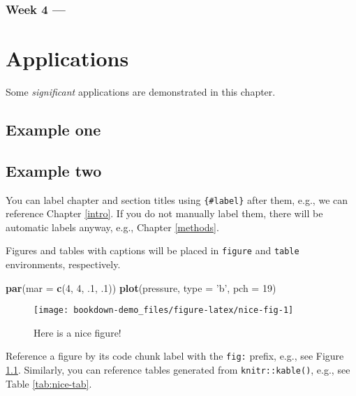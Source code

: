 \documentclass[]{book}
\newenvironment{Shaded}{\begin{snugshade}}{\end{snugshade}}
\newcommand{\KeywordTok}[1]{\textcolor[rgb]{0.13,0.29,0.53}{\textbf{{#1}}}}
\newcommand{\DataTypeTok}[1]{\textcolor[rgb]{0.13,0.29,0.53}{{#1}}}
\newcommand{\DecValTok}[1]{\textcolor[rgb]{0.00,0.00,0.81}{{#1}}}
\newcommand{\StringTok}[1]{\textcolor[rgb]{0.31,0.60,0.02}{{#1}}}
\newcommand{\NormalTok}[1]{{#1}}
\theoremstyle{definition}
\theoremstyle{definition}
\theoremstyle{remark}
\begin{document}
\subsection{Week 4 ---}\label{week-4}

\chapter{Applications}\label{applications}

Some \emph{significant} applications are demonstrated in this chapter.

\section{Example one}\label{example-one}

\section{Example two}\label{example-two}

You can label chapter and section titles using \texttt{\{\#label\}}
after them, e.g., we can reference Chapter \ref{intro}. If you do not
manually label them, there will be automatic labels anyway, e.g.,
Chapter \ref{methods}.

Figures and tables with captions will be placed in \texttt{figure} and
\texttt{table} environments, respectively.

\begin{Shaded}
\begin{Highlighting}[]
\KeywordTok{par}\NormalTok{(}\DataTypeTok{mar =} \KeywordTok{c}\NormalTok{(}\DecValTok{4}\NormalTok{, }\DecValTok{4}\NormalTok{, .}\DecValTok{1}\NormalTok{, .}\DecValTok{1}\NormalTok{))}
\KeywordTok{plot}\NormalTok{(pressure, }\DataTypeTok{type =} \StringTok{'b'}\NormalTok{, }\DataTypeTok{pch =} \DecValTok{19}\NormalTok{)}
\end{Highlighting}
\end{Shaded}

\begin{figure}

{\centering \texttt{[image: bookdown-demo\_files/figure-latex/nice-fig-1]} 

}

\caption{Here is a nice figure!}\label{fig:nice-fig}
\end{figure}

Reference a figure by its code chunk label with the \texttt{fig:}
prefix, e.g., see Figure \ref{fig:nice-fig}. Similarly, you can
reference tables generated from \texttt{knitr::kable()}, e.g., see Table
\ref{tab:nice-tab}.
\end{document}
